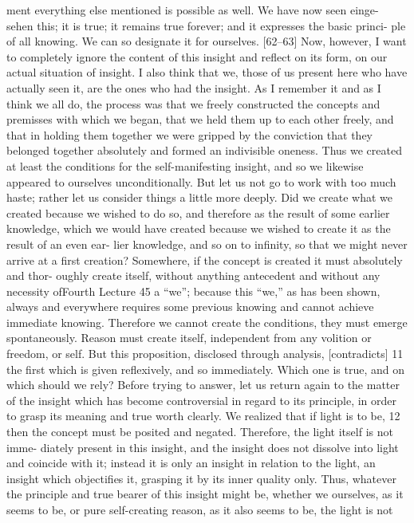 ment everything else mentioned is possible as well. We have now seen {einge-
sehen} this; it is true; it remains true forever; and it expresses the basic princi-
ple of all knowing. We can so designate it for ourselves.
[62–63] Now, however, I want to completely ignore the content of
this insight and reflect on its form, on our actual situation of insight. I also
think that we, those of us present here who have actually seen it, are the
ones who had the insight. As I remember it and as I think we all do, the
process was that we freely constructed the concepts and premisses with
which we began, that we held them up to each other freely, and that in
holding them together we were gripped by the conviction that they
belonged together absolutely and formed an indivisible oneness. Thus we
created at least the conditions for the self-manifesting insight, and so we
likewise appeared to ourselves unconditionally.
But let us not go to work with too much haste; rather let us consider
things a little more deeply. Did we create what we created because we wished
to do so, and therefore as the result of some earlier knowledge, which we
would have created because we wished to create it as the result of an even ear-
lier knowledge, and so on to infinity, so that we might never arrive at a first
creation? Somewhere, if the concept is created it must absolutely and thor-
oughly create itself, without anything antecedent and without any necessity ofFourth Lecture
45
a “we”; because this “we,” as has been shown, always and everywhere requires
some previous knowing and cannot achieve immediate knowing. Therefore
we cannot create the conditions, they must emerge spontaneously. Reason
must create itself, independent from any volition or freedom, or self. But this
proposition, disclosed through analysis, [contradicts] 11 the first which is given
reflexively, and so immediately. Which one is true, and on which should we
rely? Before trying to answer, let us return again to the matter of the insight
which has become controversial in regard to its principle, in order to grasp its
meaning and true worth clearly. We realized that if light is to be, 12 then the
concept must be posited and negated. Therefore, the light itself is not imme-
diately present in this insight, and the insight does not dissolve into light and
coincide with it; instead it is only an insight in relation to the light, an insight
which objectifies it, grasping it by its inner quality only. Thus, whatever the
principle and true bearer of this insight might be, whether we ourselves, as it
seems to be, or pure self-creating reason, as it also seems to be, the light is not
